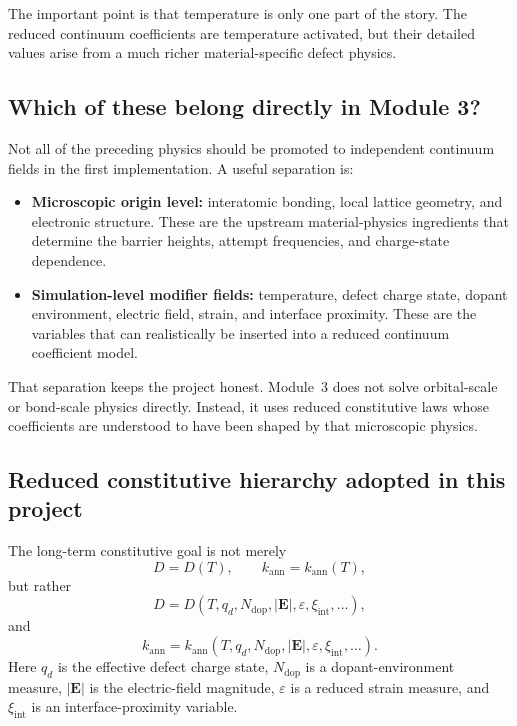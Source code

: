 \documentclass[11pt]{article}
\begin{document}
The important point is that temperature is only one part of the story. The reduced continuum coefficients are temperature activated, but their detailed values arise from a much richer material-specific defect physics.

\subsection{Which of these belong directly in Module 3?}

Not all of the preceding physics should be promoted to independent continuum fields in the first implementation. A useful separation is:
\begin{itemize}
    \item \textbf{Microscopic origin level:} interatomic bonding, local lattice geometry, and electronic structure. These are the upstream material-physics ingredients that determine the barrier heights, attempt frequencies, and charge-state dependence.
    \item \textbf{Simulation-level modifier fields:} temperature, defect charge state, dopant environment, electric field, strain, and interface proximity. These are the variables that can realistically be inserted into a reduced continuum coefficient model.
\end{itemize}

That separation keeps the project honest. Module~3 does not solve orbital-scale or bond-scale physics directly. Instead, it uses reduced constitutive laws whose coefficients are understood to have been shaped by that microscopic physics.

\subsection{Reduced constitutive hierarchy adopted in this project}

The long-term constitutive goal is not merely
\begin{equation}
D = D(T), \qquad k_{\mathrm{ann}} = k_{\mathrm{ann}}(T),
\end{equation}
but rather
\begin{equation}
D = D\left(T, q_d, N_{\mathrm{dop}}, |\mathbf{E}|, \varepsilon, \xi_{\mathrm{int}}, \ldots\right),
\end{equation}
and
\begin{equation}
k_{\mathrm{ann}} = k_{\mathrm{ann}}\left(T, q_d, N_{\mathrm{dop}}, |\mathbf{E}|, \varepsilon, \xi_{\mathrm{int}}, \ldots\right).
\end{equation}
Here $q_d$ is the effective defect charge state, $N_{\mathrm{dop}}$ is a dopant-environment measure, $|\mathbf{E}|$ is the electric-field magnitude, $\varepsilon$ is a reduced strain measure, and $\xi_{\mathrm{int}}$ is an interface-proximity variable.
\end{document}
